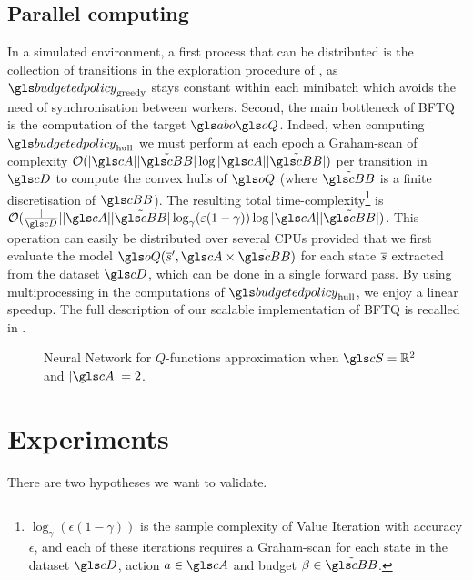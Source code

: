 \subsection{Parallel computing}
\label{subsec:parallel-computing}
In a simulated environment, a first process that can be distributed is the collection of transitions in the exploration procedure of , as $\budgetedpolicy_\text{greedy}$ stays constant within each minibatch which avoids the need of synchronisation between workers. Second, the main bottleneck of \gls{BFTQ} is the computation of the target $\abo \oQ$. Indeed, when computing $\budgetedpolicy_\text{hull}$ we must perform at each epoch a Graham-scan of complexity $\cO(|\cA||\tilde{\budgetspace}| \log |\cA||\tilde{\budgetspace}|)$ per transition in $\cD$ to compute the convex hulls of $\oQ$ (where $\tilde{\budgetspace}$ is a finite discretisation of $\budgetspace$). The resulting total time-complexity\footnote{$\log_{\gamma}(\epsilon(1-\gamma))$ is the sample complexity of Value Iteration with accuracy $\epsilon$, and each of these iterations requires a Graham-scan for each state in the dataset $\cD$, action $a\in\cA$ and budget $\beta\in\tilde{\budgetspace}$.} is $\cO(\frac|\cD||\cA||\tilde{\budgetspace}|\log_{\gamma}(\epsilon(1-\gamma)) \log |\cA||\tilde{\budgetspace}|)$. This operation can easily be distributed over several CPUs provided that we first evaluate the model $\oQ(\os',\cA \times \tilde{\budgetspace})$ for each state $\overline{s}$ extracted from the dataset $\cD$, which can be done in a single forward pass. By using multiprocessing in the computations of $\budgetedpolicy_\text{hull}$, we enjoy a linear speedup.
The full description of our scalable implementation of \gls{BFTQ} is recalled in .


\begin{figure}[tp]
	\centering
	
	\caption{Neural Network for $Q$-functions approximation when $\cS=\Real^2$ and $|\cA| = 2$.}
	\label{fig:bftq-architecture}
\end{figure}




\section{Experiments}
\label{sec:brl-experiments}
There are two hypotheses we want to validate.

